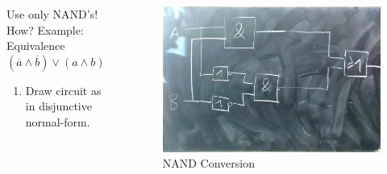 \documentclass{beamer}
\begin{document}
\begin{frame}
  \begin{columns}
  \begin{column}{5cm}
  Use only NAND's! How?
  \newline
    \newline Example: Equivalence
  \newline
  $(\overline{a}\land \overline{b})\lor(a\land b)$
  \newline
  \begin{enumerate}
   \item Draw circuit as in disjunctive normal-form.
  \end{enumerate}

  \end{column}
  
  \begin{column}{6cm}
    \begin{figure}[H]
      \centering
      \includegraphics[width=1\textwidth]{eq1}%
      \caption{NAND Conversion}%
      \label{fig:equivalence_optimized}
    \end{figure}
  \end{column}
  \end{columns}  
\end{frame}
\end{document}
